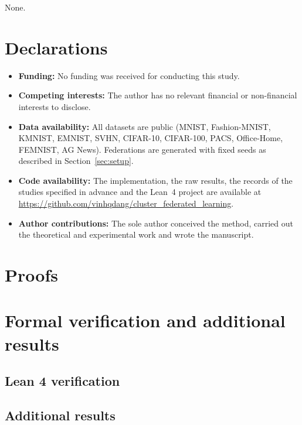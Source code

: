 \documentclass[pdflatex,sn-apa]{sn-jnl}
\theoremstyle{thmstyleone}
\theoremstyle{thmstylethree}
\begin{document}
\backmatter

None.

\section*{Declarations}
\begin{itemize}
\item \textbf{Funding:} No funding was received for conducting this study.
\item \textbf{Competing interests:} The author has no relevant financial or non-financial interests to disclose.
\item \textbf{Data availability:} All datasets are public (MNIST, Fashion-MNIST, KMNIST, EMNIST, SVHN, CIFAR-10, CIFAR-100, PACS, Office-Home, FEMNIST, AG News). Federations are generated with fixed seeds as described in Section~\ref{sec:setup}.
\item \textbf{Code availability:} The implementation, the raw results, the records of the studies specified in advance and the Lean~4 project are available at \url{https://github.com/vinhqdang/cluster_federated_learning}.
\item \textbf{Author contributions:} The sole author conceived the method, carried out the theoretical and experimental work and wrote the manuscript.
\end{itemize}



\begin{appendices}

\section{Proofs}\label{app:proofs}


\section{Formal verification and additional results}
\subsection{Lean 4 verification}\label{app:lean}


\subsection{Additional results}\label{app:figs}





\end{appendices}
\end{document}
